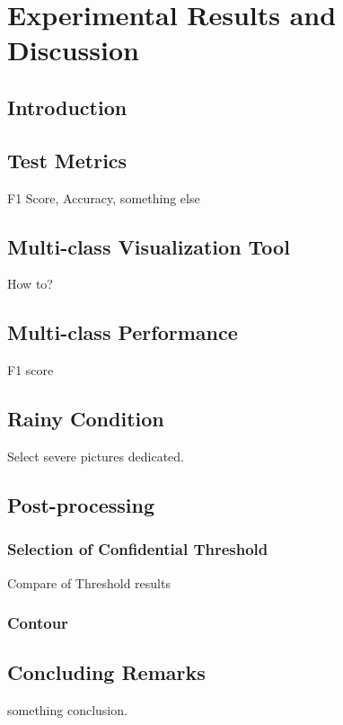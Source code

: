 
\chapter{Experimental Results and Discussion}
\label{cha:experiments}
\begin{spacing}{1.5}
\setlength{\parskip}{0.3in}

\section{Introduction}

\section{Test Metrics}

F1 Score, Accuracy, something else

\section{Multi-class Visualization Tool}

How to?

\section{Multi-class Performance}

F1 score

\section{Rainy Condition}

Select severe pictures dedicated.

\section{Post-processing}

\subsection{Selection of Confidential Threshold}

Compare of Threshold results

\subsection{Contour}


\section{Concluding Remarks}

something conclusion.

\end{spacing}
\newpage
